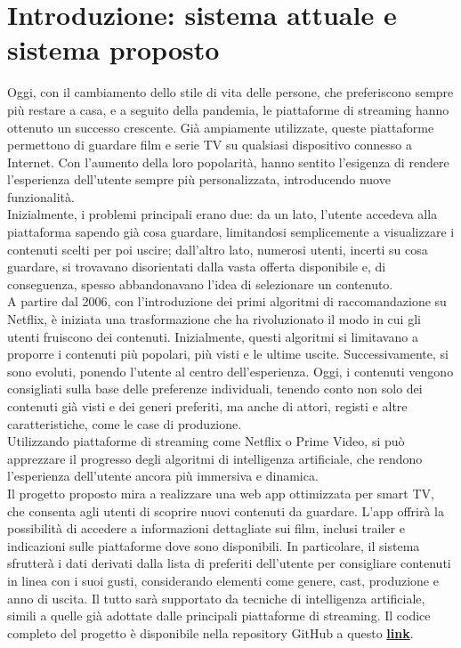 \documentclass[a4paper,12pt]{article}
\begin{document}
\section{Introduzione: sistema attuale e sistema proposto}
Oggi, con il cambiamento dello stile di vita delle persone, che preferiscono sempre più restare a casa, e a seguito della pandemia, le piattaforme di streaming hanno ottenuto un successo crescente. Già ampiamente utilizzate, queste piattaforme permettono di guardare film e serie TV su qualsiasi dispositivo connesso a Internet. Con l’aumento della loro popolarità, hanno sentito l’esigenza di rendere l’esperienza dell’utente sempre più personalizzata, introducendo nuove funzionalità.\\
Inizialmente, i problemi principali erano due: da un lato, l’utente accedeva alla piattaforma sapendo già cosa guardare, limitandosi semplicemente a visualizzare i contenuti scelti per poi uscire; dall’altro lato, numerosi utenti, incerti su cosa guardare, si trovavano disorientati dalla vasta offerta disponibile e, di conseguenza, spesso abbandonavano l’idea di selezionare un contenuto.\\
A partire dal 2006, con l’introduzione dei primi algoritmi di raccomandazione su Netflix, è iniziata una trasformazione che ha rivoluzionato il modo in cui gli utenti fruiscono dei contenuti. Inizialmente, questi algoritmi si limitavano a proporre i contenuti più popolari, più visti e le ultime uscite. Successivamente, si sono evoluti, ponendo l’utente al centro dell’esperienza. Oggi, i contenuti vengono consigliati sulla base delle preferenze individuali, tenendo conto non solo dei contenuti già visti e dei generi preferiti, ma anche di attori, registi e altre caratteristiche, come le case di produzione.\\
Utilizzando piattaforme di streaming come Netflix o Prime Video, si può apprezzare il progresso degli algoritmi di intelligenza artificiale, che rendono l’esperienza dell’utente ancora più immersiva e dinamica.\\
Il progetto proposto mira a realizzare una web app ottimizzata per smart TV, che consenta agli utenti di scoprire nuovi contenuti da guardare. L’app offrirà la possibilità di accedere a informazioni dettagliate sui film, inclusi trailer e indicazioni sulle piattaforme dove sono disponibili. In particolare, il sistema sfrutterà i dati derivati dalla lista di preferiti dell’utente per consigliare contenuti in linea con i suoi gusti, considerando elementi come genere, cast, produzione e anno di uscita. Il tutto sarà supportato da tecniche di intelligenza artificiale, simili a quelle già adottate dalle principali piattaforme di streaming.
Il codice completo del progetto è disponibile nella repository GitHub a questo \textcolor{blue}{\href{https://github.com/LRuocco22/NozApp/}{\textbf{{link}}}}.
\end{document}
